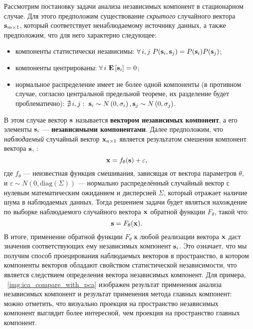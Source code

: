Рассмотрим постановку задачи анализа независимых компонент в стационарном случае. Для этого предположим существование \textit{скрытого} случайного вектора $\mathrm{\mathbf{s}}_{m \times 1}$, который соответствует ненаблюдаемому источнику данных, а также предположим, что для него характерно следующее:
\begin{itemize}
    \item компоненты статистически независимы: $\forall\, i,j\ P(\mathrm{\mathbf{s}}_{i}, \mathrm{\mathbf{s}}_{j}) = P(\mathrm{\mathbf{s}}_{i}) P(\mathrm{\mathbf{s}}_{j})$;
    \item компоненты центрированы: $\forall\, i\ \expectation{\vector{s}_{i}} = 0$;
    \item нормальное распределение имеет не более одной компоненты (в противном случае, согласно центральной предельной теореме, их разделение будет проблематично): $\nexists\, i,j:\ \vector{s}_{i} \sim N\left(0, \sigma_{i}\right), \vector{s}_{j} \sim N\left(0, \sigma_{j}\right)$.
\end{itemize}
В этом случае вектор $\mathrm{\mathbf{s}}$ называется \textbf{вектором независимых компонент}, а его элементы $\mathrm{\mathbf{s}}_{i}$ --- \textbf{независимыми компонентами}. Далее предположим, что \textit{наблюдаемый} случайный вектор $\mathrm{\mathbf{x}}_{n \times 1}$ является результатом смешения компонент вектора $\mathrm{\mathbf{s}}$, \ie: $$\mathrm{\mathbf{x}} = f_{\theta}(\mathrm{\mathbf{s}}) + \mathrm{\mathbf{\varepsilon}},$$ где $f_{\theta}$ --- неизвестная функция смешивания, зависящая от вектора параметров $\theta$, и $\varepsilon \sim N\left(0, \text{diag}\left(\Sigma\right)\right)$ --- нормально распределённый случайный вектор с нулевым математическим ожиданием и дисперсией $\Sigma$, который отражает наличие шума в наблюдаемых данных. Тогда решением задачи  будет являться нахождение по выборке наблюдаемого случайного вектора $\mathrm{\mathbf{x}}$ обратной функции $F_{\theta}$, такой что: $$\mathrm{\mathbf{s}} = F_{\theta}(\mathrm{\mathbf{x}}).$$ 
В итоге, применение обратной функции $F_{\theta}$ к любой реализации вектора $\mathrm{\mathbf{x}}$ даст значения соответствующих ему независимых компонент $\mathrm{\mathbf{s}}_{i}$. Это означает, что мы получим способ проецирования наблюдаемых векторов в пространство, в котором компоненты векторов обладают свойством статистической независимости, что является следствием определения вектора независимых компонент. Для примера, \onfigure~\ref{img:ica_compare_with_pca} изображен результат применения анализа независимых компонент и результат применения метода главных компонент: можно отметить, что визуально проекция на пространство независимых компонент выглядит более интересной, чем проекция на пространство главных компонент.

